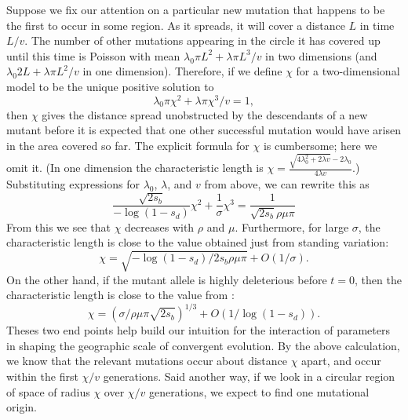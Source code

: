 \documentclass{article}
\begin{document}
Suppose we fix our attention on a particular new mutation that happens to be the first to occur in some region.
As it spreads, it will cover a distance $L$ in time $L/v$.
The number of other mutations appearing in the circle it has covered up until this time is Poisson with mean
$\lambda_0 \pi L^2 + \lambda \pi L^3 /v$ in two dimensions
(and $\lambda_0 2 L + \lambda \pi L^2 /v$ in one dimension).
Therefore, if we define $\chi$ for a two-dimensional model to be the unique positive solution to
\begin{equation}
    \lambda_0 \pi \chi^2 + \lambda \pi \chi^3 /v = 1,
\end{equation}
then $\chi$ gives the distance spread unobstructed by the descendants of a new mutant
before it is expected that one other successful mutation would have arisen in the area covered so far.
The explicit formula for $\chi$ is cumbersome; here we omit it.
(In one dimension the characteristic length is $\chi = \frac{ \sqrt{ 4 \lambda_0^2 + 2\lambda v } - 2 \lambda_0 }{ 4 \lambda v }$.)
Substituting expressions for $\lambda_0$, $\lambda$, and $v$ from above,
we can rewrite this as
\begin{equation} \label{eqn:defines_chi}
   \frac{\sqrt{2s_b} }{-\log(1-s_d) } \chi^2 + \frac{1}{\sigma} \chi^3 = \frac{1}{\sqrt{2s_b} \rho\mu\pi}
\end{equation}
From this we see that $\chi$ decreases with $\rho$ and $\mu$.
Furthermore, for large $\sigma$, the characteristic length is close to the value obtained just from standing variation:
\begin{equation} \label{eqn:chi_standing}
\chi = \sqrt{ -\log(1-s_d) / 2 s_b \rho \mu \pi } + O(1/\sigma).
\end{equation}
On the other hand, if the mutant allele is highly deleterious before $t=0$,
then the characteristic length is close to the value from \citet{ralphcoop2010}:
\begin{equation} \label{eqn:chi_new}
\chi = ( \sigma / \rho \mu \pi \sqrt{2 s_b} )^{1/3} + O(1/\log(1-s_d)).
\end{equation}
Theses two end points help build our intuition for the interaction of
parameters in shaping the geographic scale of convergent evolution.
By the above calculation, we know that the relevant mutations occur about distance $\chi$ apart, 
 and occur within the first $\chi/v$ generations.
 Said another way, if we look in a circular region of space of radius $\chi$ over $\chi/v$ generations,
 we expect to find one mutational origin.
\end{document}
